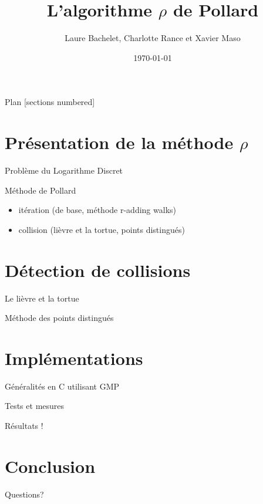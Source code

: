 \documentclass{beamer}
\title{L'algorithme $\rho$ de Pollard}
\date{\today}
\author{Laure Bachelet, Charlotte Rance et Xavier Maso}
\institute{Master CSI, Université de Bordeaux}
\begin{document}
  \maketitle

  \begin{frame}{Plan}
    [sections numbered]
	  \tableofcontents[hideallsubsections]
  \end{frame}


  \section{Présentation de la méthode $\rho$}

  \begin{frame}{Problème du Logarithme Discret}
  \end{frame}

  \begin{frame}{Méthode de Pollard}
	  \begin{itemize}
      \item itération (de base, méthode r-adding walks)
      \item collision (lièvre et la tortue, points distingués)
		\end{itemize}
  \end{frame}


  \section{Détection de collisions}

  \begin{frame}{Le lièvre et la tortue}
  \end{frame}

  \begin{frame}{Méthode des points distingués}
  \end{frame}


  \section{Implémentations}

  \begin{frame}{Généralités}
    en C utilisant GMP
  \end{frame}

  \begin{frame}{Tests et mesures}
  \end{frame}

	\begin{frame}{Résultats !}
	\end{frame}

	\section{Conclusion}

	{
	\begin{frame}[standout]
	  Questions?
	\end{frame}
	}
\end{document}
